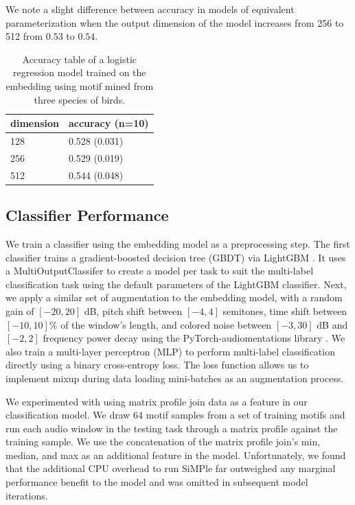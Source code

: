 \documentclass[
]{ceurart}
\begin{document}
We note a slight difference between accuracy in models of equivalent parameterization when the output dimension of the model increases from 256 to 512 from $0.53$ to $0.54$.

\begin{table}[h]
\begin{tabular}{|l|l|}
\hline
dimension & accuracy (n=10) \\ \hline
128       & 0.528 (0.031)   \\ \hline
256       & 0.529 (0.019)   \\ \hline
512       & 0.544 (0.048)   \\ \hline
\end{tabular}
\caption{Accuracy table of a logistic regression model trained on the embedding using motif mined from three species of birds. }
\label{tab:emb-acc}
\end{table}

\subsection{Classifier Performance}

We train a classifier using the embedding model as a preprocessing step. The first classifier trains a gradient-boosted decision tree (GBDT) via LightGBM \cite{ke2017lightgbm}. It uses a MultiOutputClassifer to create a model per task to suit the multi-label classification task using the default parameters of the LightGBM classifier. Next, we apply a similar set of augmentation to the embedding model, with a random gain of $[-20, 20]$ dB, pitch shift between $[-4, 4]$ semitones, time shift between $[-10, 10]\%$ of the window's length, and colored noise between $[-3, 30]$ dB and $[-2, 2]$ frequency power decay using the PyTorch-audiomentations library \cite{pytorch-audiomentations}. We also train a multi-layer perceptron (MLP) to perform multi-label classification directly using a binary cross-entropy loss. The loss function allows us to implement mixup \cite{zhang2017mixup} during data loading mini-batches as an augmentation process.

We experimented with using matrix profile join data as a feature in our classification model. We draw 64 motif samples from a set of training motifs and run each audio window in the testing task through a matrix profile against the training sample. We use the concatenation of the matrix profile join's min, median, and max as an additional feature in the model. Unfortunately, we found that the additional CPU overhead to run SiMPle far outweighed any marginal performance benefit to the model and was omitted in subsequent model iterations.
\end{document}
